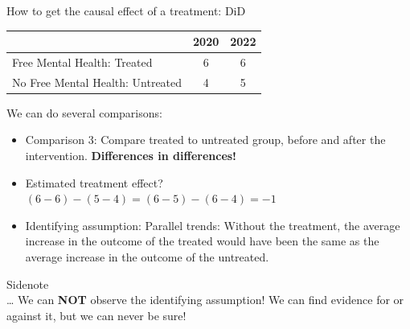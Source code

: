 \documentclass[11pt]{beamer}
\begin{document}
\begin{frame}{How to get the causal effect of a treatment: DiD}


\begin{table}[]
\begin{tabular}{lcc}
\toprule
\textbf{}                        & \textbf{2020} & \textbf{2022} \\ \midrule
Free Mental Health: Treated      &    6       & 6          \\ \midrule
No Free Mental Health: Untreated &    4       & 5        \\ \bottomrule
\end{tabular}
\end{table}

We can do several comparisons:
\begin{itemize}[<+- | alert@+>]
\item Comparison 3: Compare treated to untreated group, before and after the intervention. \textbf{Differences in differences!}
\item Estimated treatment effect? $(6-6)-(5-4)=(6-5)-(6-4)=-1$
\item Identifying assumption: Parallel trends: Without the treatment, the average increase in the outcome of the treated would have been the same as the average increase in the outcome of the untreated.
\end{itemize} 
\end{frame}


{
\begin{frame}[standout]
    \raggedright
  Sidenote \\ \vspace{1cm}
  \raggedleft
  \dots{ } We can \textbf{NOT} observe the identifying assumption! We can find evidence for or against it, but we can never be sure!
\end{frame}}
\end{document}
